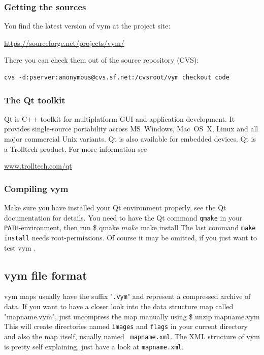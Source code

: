 \documentclass[12pt,a4paper]{article}
\newcommand{\vym}{{\sc vym }}
\newenvironment{code}[1] { \verbatim #1}{\endverbatim  }
\begin{document}
\begin{appendix}
\subsubsection{Getting the sources} \label{getsources}
You find the latest version of \vym at the project site:
\begin{center}
\href{https://sourceforge.net/projects/vym/}{https://sourceforge.net/projects/vym/}
\end{center}
There you can check them out of the source repository (CVS):\\

\begin{verbatim}
cvs -d:pserver:anonymous@cvs.sf.net:/cvsroot/vym checkout code
\end{verbatim}

\subsubsection{The Qt toolkit}
Qt is C++ toolkit for multiplatform GUI and application development. It
provides single-source portability across MS~Windows, Mac~OS~X, Linux
and all major commercial Unix variants. Qt is also available for
embedded devices. Qt is a Trolltech product. For more information see 
\begin{center}
\href{http://www.trolltech.com/qt/}{www.trolltech.com/qt} 
\end{center}


\subsubsection{Compiling \vym }
Make sure you have installed your Qt environment properly, see the Qt
documentation for details. You need to have the Qt command {\tt qmake}
in your {\tt PATH}-environment, then run
\begin{code}
\$ qmake
$ make  
$ make install
\end{code}
The last command {\tt make install} needs root-permissions. Of course it
may be omitted, if you just want to test \vym.


\subsection{\vym file format} \label{fileformat}
\vym maps usually have the suffix "{\tt .vym}" and represent a
compressed archive of data. If you want to have a
closer look into the data structure map called "mapname.vym", 
just uncompress the map manually using
\begin{code}
\$ unzip mapname.vym
\end{code}
This will create directories named {\tt images} and {\tt flags} in your
current directory and also the map itself, usually named {\tt
mapname.xml}.
The XML structure of \vym is pretty self explaining, just have a look at
{\tt mapname.xml}.


\end{appendix}
\end{document}
